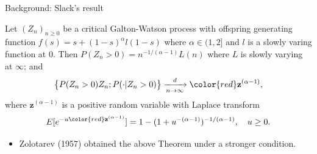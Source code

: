 \documentclass[xcolor=dvipsnames]{beamer}
\begin{document}
\begin{frame}{Background: Slack's result}
\begin{theorem}[Slack (1968)]
	Let $(Z_n)_{n\geq 0}$ be a critical Galton-Watson process with offspring generating function
$
	f(s)
	= s + (1-s)^{\alpha} l(1-s)
$
  where $\alpha \in (1,2]$ and $l$ is a slowly varing function at $0$.
  Then
$
	P(Z_n > 0) = n^{-1/(\alpha-1)} L(n)
$ 
where $L$ is slowly varying at $\infty$;
 and
\[
  \big\{ P(Z_n > 0) Z_n; P(\cdot | Z_n > 0)\big\}
	\xrightarrow[n\to \infty]{d} {\color{red}\mathbf z^{(\alpha-1)} },
\]
	where {\color{red} $\mathbf z^{(\alpha-1)}$} is a positive random variable with Laplace transform
\[
	E[e^{- u {\color{red} \mathbf z^{(\alpha-1)}} } ]
	= 1 - (1+ u^{-(\alpha-1)})^{-1/(\alpha-1)},
	\quad u \geq 0.
\]
\end{theorem}
\begin{itemize}
\item
  Zolotarev (1957) obtained the above Theorem under a stronger condition.
\end{itemize}
\end{frame}
\end{document}
